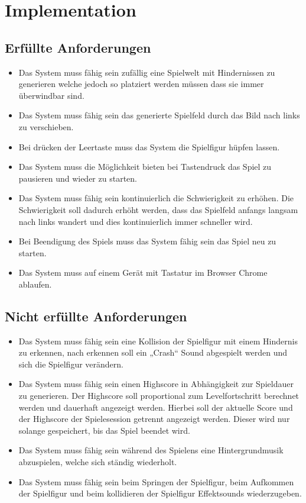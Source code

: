 \section{Implementation}
\subsection{Erfüllte Anforderungen}
\begin{itemize}
	\item Das System muss fähig sein zufällig eine Spielwelt mit Hindernissen zu generieren welche jedoch so platziert werden müssen dass sie immer überwindbar sind.
	\item Das System muss fähig sein das generierte Spielfeld durch das Bild nach links zu verschieben.
	\item Bei drücken der Leertaste muss das System die Spielfigur hüpfen lassen.
	\item Das System muss die Möglichkeit bieten bei Tastendruck das Spiel zu pausieren und wieder zu starten.
	\item Das System muss fähig sein kontinuierlich die Schwierigkeit zu erhöhen. Die Schwierigkeit soll dadurch erhöht werden, dass das Spielfeld anfangs langsam nach links wandert und dies kontinuierlich immer schneller wird.
	\item Bei Beendigung des Spiels muss das System fähig sein das Spiel neu zu starten. 
	\item Das System muss auf einem Gerät mit Tastatur im Browser Chrome ablaufen.
\end{itemize}

\subsection{Nicht erfüllte Anforderungen}
\begin{itemize}
	\item Das System muss fähig sein eine Kollision der Spielfigur mit einem Hindernis zu erkennen, nach erkennen soll ein „Crash“ Sound abgespielt werden und sich die Spielfigur verändern.
	\item Das System muss fähig sein einen Highscore in Abhängigkeit zur Spieldauer zu generieren. Der Highscore soll proportional zum Levelfortschritt berechnet werden und dauerhaft angezeigt werden. Hierbei soll der aktuelle Score und der Highscore der Spielesession getrennt angezeigt werden. Dieser wird nur solange gespeichert, bis das Spiel beendet wird.
	\item Das System muss fähig sein während des Spielens eine Hintergrundmusik abzuspielen, welche sich ständig wiederholt.
	\item Das System muss fähig sein beim Springen der Spielfigur, beim Aufkommen der Spielfigur und beim kollidieren der Spielfigur Effektsounds   wiederzugeben.
\end{itemize}

